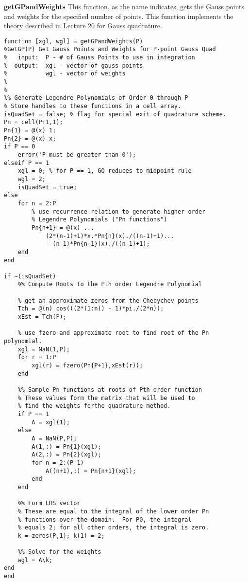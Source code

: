 \noindent\textbf{getGPandWeights}
This function, as the name indicates, gets the Gauss points and weights for the specified number of points.  This function implements the theory described in Lecture 20 for Gauss quadrature.  

\vspace{0.1cm}


\begin{lstlisting}[style=myMatlab,name=lec34n-ex2]
function [xgl, wgl] = getGPandWeights(P)
%GetGP(P) Get Gauss Points and Weights for P-point Gauss Quad
%   input:  P - # of Gauss Points to use in integration
%  output:  xgl - vector of gauss points
%           wgl - vector of weights
%
%
%% Generate Legendre Polynomials of Order 0 through P
% Store handles to these functions in a cell array.
isQuadSet = false; % flag for special exit of quadrature scheme.
Pn = cell(P+1,1);
Pn{1} = @(x) 1;
Pn{2} = @(x) x;
if P == 0
    error('P must be greater than 0');
elseif P == 1
    xgl = 0; % for P == 1, GQ reduces to midpoint rule 
    wgl = 2;
    isQuadSet = true;
else
    for n = 2:P
        % use recurrence relation to generate higher order 
        % Legendre Polynomials ("Pn functions")
        Pn{n+1} = @(x) ...
            (2*(n-1)+1)*x.*Pn{n}(x)./((n-1)+1)...
            - (n-1)*Pn{n-1}(x)./((n-1)+1);
    end
end

if ~(isQuadSet)
    %% Compute Roots to the Pth order Legendre Polynomial
    
    % get an approximate zeros from the Chebychev points
    Tch = @(n) cos(((2*(1:n)) - 1)*pi./(2*n));
    xEst = Tch(P);
    
    % use fzero and approximate root to find root of the Pn polynomial.
    xgl = NaN(1,P);
    for r = 1:P
        xgl(r) = fzero(Pn{P+1},xEst(r));
    end
    
    %% Sample Pn functions at roots of Pth order function
    % These values form the matrix that will be used to 
    % find the weights forthe quadrature method.
    if P == 1
        A = xgl(1);
    else
        A = NaN(P,P);
        A(1,:) = Pn{1}(xgl);
        A(2,:) = Pn{2}(xgl);
        for n = 2:(P-1)
            A((n+1),:) = Pn{n+1}(xgl);
        end
    end
    
    %% Form LHS vector
    % These are equal to the integral of the lower order Pn 
    % functions over the domain.  For P0, the integral 
    % equals 2; for all other orders, the integral is zero.
    k = zeros(P,1); k(1) = 2;
    
    %% Solve for the weights
    wgl = A\k;
end
end
\end{lstlisting}

